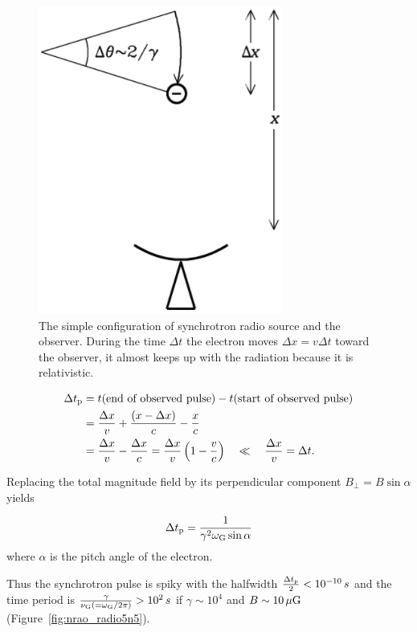 \begin{figure}[htbp]
	\centering
	\includegraphics[width=.3\linewidth]{Chapter_2/Figures/NRAO_radio5n4.png}
    \caption[Simple condiguration of the synchrotron source and observer]{\label{fig:nrao_radio5n4}
        The simple configuration of synchrotron radio source and the observer.
        During the time $\Delta t$ the electron moves $\Delta x = v\Delta t$ toward the observer, it almost keeps up with the radiation because it is relativistic.
    }
\end{figure}

\begin{equation}\label{eq:essential_radio5n54}
    \begin{aligned}
        \Delta t_{\mathrm{p}} &=t(\text{end of observed pulse})-t(\text{start of observed pulse}) \\
                              &=\frac{\Delta x}{v}+\frac{(x-\Delta x)}{c}-\frac{x}{c} \\
                              &= \frac{\Delta x}{v}-\frac{\Delta x}{c}=\frac{\Delta x}{v}\left(1-\frac{v}{c}\right) \quad \ll \quad \frac{\Delta x}{v}=\Delta t.
    \end{aligned}
\end{equation}

Replacing the total magnitude field by its perpendicular component $B_{\perp} = B\sin\alpha$ yields

\begin{equation}\label{eq:essential_radio5n60}
    \Delta t_{\mathrm{p}} = \frac{1}{\gamma^2 \omega_{\mathrm{G}} \sin \alpha}
\end{equation}
where $\alpha$ is the pitch angle of the electron.

Thus the synchrotron pulse is spiky with the halfwidth $\frac{\Delta t_{\mathrm{p}}}{2} < 10^{-10}\,s$ and the time period is $\frac{\gamma}{\nu_{\mathrm{G}} \left(=\omega_{\mathrm{G}} / 2\pi\right)} > 10^2\,s$ if $\gamma \sim 10^4$ and $B \sim 10\,\mathrm{\mu G}$ (Figure~\ref{fig:nrao_radio5n5}).

